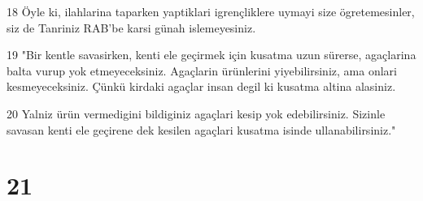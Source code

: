 \par 18 Öyle ki, ilahlarina taparken yaptiklari igrençliklere uymayi size ögretemesinler, siz de Tanriniz RAB'be karsi günah islemeyesiniz.
\par 19 "Bir kentle savasirken, kenti ele geçirmek için kusatma uzun sürerse, agaçlarina balta vurup yok etmeyeceksiniz. Agaçlarin ürünlerini yiyebilirsiniz, ama onlari kesmeyeceksiniz. Çünkü kirdaki agaçlar insan degil ki kusatma altina alasiniz.
\par 20 Yalniz ürün vermedigini bildiginiz agaçlari kesip yok edebilirsiniz. Sizinle savasan kenti ele geçirene dek kesilen agaçlari kusatma isinde ullanabilirsiniz."

\chapter{21}


